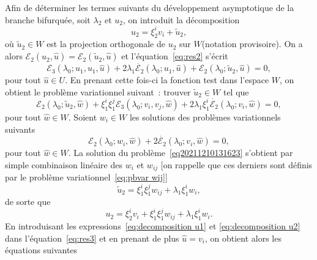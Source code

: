 \documentclass{article}
\begin{document}
Afin de déterminer les termes suivants du développement asymptotique
de la branche bifurquée, soit $\lambda_2$ et $u_2$, on introduit la
décomposition
\begin{equation}
  u_2 = \xi_2^i v_i + \tilde{u}_2,
\end{equation}
où $\tilde{u}_2 \in W$ est la projection orthogonale de $u_2$ sur
$W$(notation provisoire). On a alors $\mathcal{E}_2 (u_2, \hat{u})
=\mathcal{E}_2 (\tilde{u}_2, \hat{u})$ et l'équation~\eqref{eq:res2}
s'écrit
\begin{equation}
  \mathcal{E}_3 (\lambda_0 ; u_1, u_1, \hat{u}) + 2 \lambda_1
  \dot{\mathcal{E}_2} (\lambda_0 ; u_1, \hat{u}) +\mathcal{E}_2 (\lambda_0 ;
  \tilde{u}_2, \hat{u}) = 0,
\end{equation}
pour tout $\hat{u} \in U$. En prenant cette fois-ci la fonction test dans
l'espace $W$, on obtient le problème variationnel suivant~: trouver
$\tilde{u}_2 \in W$ tel que
\begin{equation}
  \label{eq20211210131623} \mathcal{E}_2 (\lambda_0 ; {\tilde{u}_2} , \hat{w})
  + \xi_1^i \xi_1^j \mathcal{E}_3 (\lambda_0 ; v_i, v_j, \hat{w}) + 2
  \lambda_1 \xi_1^i  \dot{\mathcal{E}_2} (\lambda_0 ; v_i, \hat{w}) = 0,
\end{equation}
pour tout $\hat{w} \in W$. Soient $w_i \in W$ les solutions des problèmes
variationnels suivants
\begin{equation}
  \label{eq:pbvar wi} \mathcal{E}_2 (\lambda_0 ; w_i, \hat{w}) + 2
  \dot{\mathcal{E}_2} (\lambda_0 ; v_i, \hat{w}) = 0,
\end{equation}
pour tout $\hat{w} \in W$. La solution du
problème~\eqref{eq20211210131623} s'obtient par simple combinaison
linéaire des $w_i$ et $w_{ij}$ [on rappelle que ces derniers sont
définis par le problème variationnel~\eqref{eq:pbvar wij}]
\begin{equation}
  \tilde{u}_2 = \xi_1^i \xi_1^j w_{i  j} + \lambda_1 \xi_1^i w_i,
\end{equation}
de sorte que
\begin{equation}
  \label{eq:decomposition u2} u_2 = \xi_2^i v_i + \xi_1^i \xi_1^j w_{i
   j} + \lambda_1 \xi_1^i w_i .
\end{equation}
En introduisant les expressions~\eqref{eq:decomposition u1} et
\eqref{eq:decomposition u2} dans l'équation~\eqref{eq:res3} et en prenant
de plus $\hat{u} = v_i$, on obtient alors les équations suivantes
\end{document}
